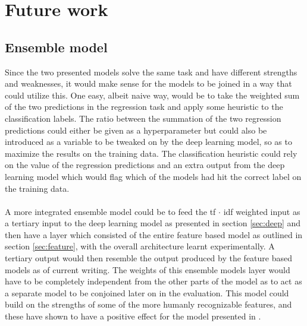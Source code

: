 
\section{Future work}

\subsection{Ensemble model}
Since the two presented models solve the same task and have different strengths and weaknesses, it would make sense for the models to be joined in a way that could utilize this. One easy, albeit naive way, would be to take the weighted sum of the two predictions in the regression task and apply some heuristic to the classification labels. The ratio between the summation of the two regression predictions could either be given as a hyperparameter but could also be introduced as a variable to be tweaked on by the deep learning model, so as to maximize the results on the training data. The classification heuristic could rely on the value of the regression predictions and an extra output from the deep learning model which would flag which of the models had hit the correct label on the training data.\\
\\
A more integrated ensemble model could be to feed the tf $\cdot$ idf weighted input as a tertiary input to the deep learning model as presented in section \ref{sec:deep} and then have a layer which consisted of the entire feature based model as outlined in section \ref{sec:feature}, with the overall architecture learnt experimentally. A tertiary output would then resemble the output produced by the feature based models as of current writing. The weights of this ensemble models layer would have to be completely independent from the other parts of the model as to act as a separate model to be conjoined later on in the evaluation. This model could build on the strengths of some of the more humanly recognizable features, and these have shown to have a positive effect for the model presented in \cite{ims}.

